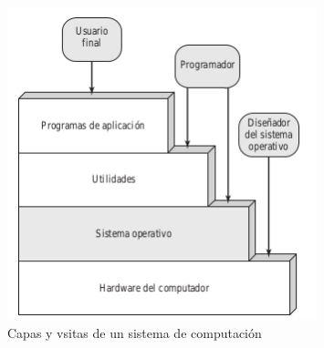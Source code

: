 \documentclass{article}
\begin{document}
							\begin{figure}
							\caption{Capas y vsitas de un sistema de computación}
							\label{figura14:capasScomputacion}
							\centering
							\includegraphics[width=0.8\textwidth, scale=1]{figura14.png}
							\end{figure}
					
\end{document}

